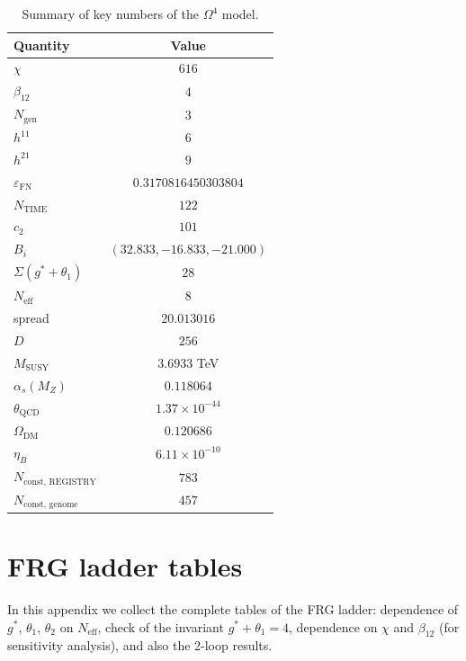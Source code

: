 \documentclass[11pt,a4paper]{article}
\newcommand{\Om}{\ensuremath{\Omega^4}}
\theoremstyle{definition}
\begin{document}
\begin{table}[ht]
\centering
\caption{Summary of key numbers of the \texorpdfstring{$\Om$}{} model.}
\label{tab:app-summary-numbers}
\begin{tabular}{lc}
\toprule
Quantity & Value \\
\midrule
$\chi$ & $616$ \\
$\beta_{12}$ & $4$ \\
$N_{\text{gen}}$ & $3$ \\
$h^{11}$ & $6$ \\
$h^{21}$ & $9$ \\
$\varepsilon_{\text{FN}}$ & $0.3170816450303804$ \\
$N_{\text{TIME}}$ & $122$ \\
$c_2$ & $101$ \\
$B_i$ & $(32.833, -16.833, -21.000)$ \\
$\Sigma(g^*+\theta_1)$ & $28$ \\
$N_{\text{eff}}$ & $8$ \\
spread & $20.013016$ \\
$D$ & $256$ \\
$M_{\text{SUSY}}$ & $3.6933$ TeV \\
$\alpha_s(M_Z)$ & $0.118064$ \\
$\theta_{\text{QCD}}$ & $1.37 \times 10^{-44}$ \\
$\Omega_{\text{DM}}$ & $0.120686$ \\
$\eta_B$ & $6.11 \times 10^{-10}$ \\
$N_{\text{const, REGISTRY}}$ & $783$ \\
$N_{\text{const, genome}}$ & $457$ \\
\bottomrule
\end{tabular}
\end{table}

\section{FRG ladder tables}
\label{app:frg-tables}

In this appendix we collect the complete tables of the FRG ladder:
dependence of $g^*$, $\theta_1$, $\theta_2$ on $N_{\text{eff}}$,
check of the invariant $g^* + \theta_1 = 4$, dependence on
$\chi$ and $\beta_{12}$ (for sensitivity analysis), and also
the 2-loop results.
\end{document}
